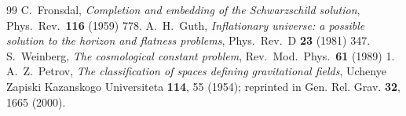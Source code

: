 \documentclass[11pt,a4paper]{article}
\theoremstyle{definition}
\begin{document}
\begin{thebibliography}{99}
 C.~Fronsdal, \emph{Completion and embedding of the Schwarzschild solution}, Phys.\ Rev.\ \textbf{116} (1959) 778.
 A.~H.~Guth, \emph{Inflationary universe: a possible solution to the horizon and flatness problems}, Phys.\ Rev.\ D \textbf{23} (1981) 347.
 S.~Weinberg, \emph{The cosmological constant problem}, Rev.\ Mod.\ Phys.\ \textbf{61} (1989) 1.
A.~Z.~Petrov,
\emph{The classification of spaces defining gravitational fields},
Uchenye Zapiski Kazanskogo Universiteta \textbf{114}, 55 (1954); reprinted in Gen. Rel. Grav. \textbf{32}, 1665 (2000).
\end{thebibliography}
\end{document}
